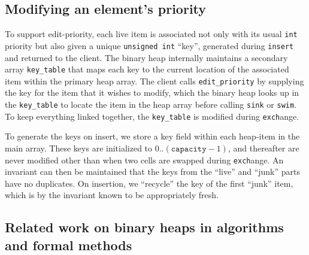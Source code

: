 \vspace*{-0.5em}
\subsection{Modifying an element's priority}
\label{sec:modpri}
\vspace*{-0.25em}


To support edit-priority, each live item is associated not only with its usual \texttt{int} priority
but also given a unique \texttt{unsigned int} ``key'', generated during \texttt{insert} and returned to the client.
The binary heap internally maintains a secondary array \texttt{key\_table} that maps each key to the current location of the associated item within the primary heap array. The client calls \texttt{edit\_priority} by supplying the key for the item that it wishes to modify, which the binary heap looks up in the \texttt{key\_table} to
locate the item in the heap array before calling \texttt{sink} or \texttt{swim}. To keep everything linked together, the \texttt{key\_table} is modified during \texttt{exch}ange.

To generate the keys on insert, we store a key field within each heap-item in the main array.  These keys are initialized to $0..(\texttt{capacity}-1)$, and thereafter are never modified other than when two cells are swapped during \texttt{exch}ange.  An invariant can then be maintained that the keys from the ``live'' and ``junk'' parts have no duplicates.  On insertion, we ``recycle'' the key of the first ``junk'' item, which is by the invariant known to be appropriately fresh.


\vspace*{-0.5em}
\subsection{Related work on binary heaps in algorithms and formal methods}
\label{sec:relworkbinheap}
\vspace*{-0.25em}

